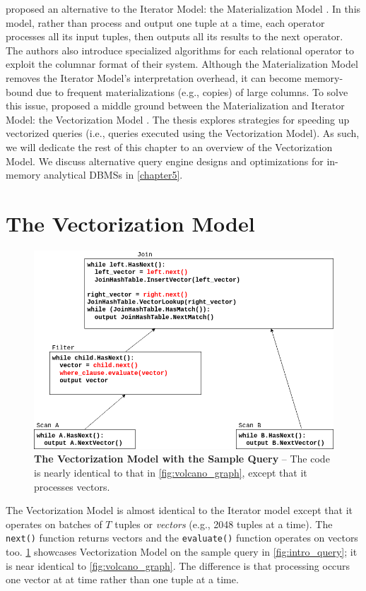 \documentclass[12pt]{cmuthesis}
\begin{document}
\citeauthor{monetdb2} proposed an alternative to the Iterator Model: the Materialization Model \cite{monetdb2}. In this model, rather than process and output one tuple at a time, each operator processes all its input tuples, then outputs all its results to the next operator. The authors also introduce specialized algorithms for each relational operator to exploit the columnar format of their system. Although the Materialization Model removes the Iterator Model's interpretation overhead, it can become memory-bound due to frequent materializations (e.g., copies) of large columns. To solve this issue, \citeauthor{boncz_vector} proposed a middle ground between the Materialization and Iterator Model: the Vectorization Model \cite{boncz_vector}. The thesis explores strategies for speeding up vectorized queries (i.e., queries executed using the Vectorization Model). As such, we will dedicate the rest of this chapter to an overview of the Vectorization Model. We discuss alternative query engine designs and optimizations for in-memory analytical DBMSs in \cref{chapter5}.

\section{The Vectorization Model}
\begin{figure}[t!]
    \centering
    \includegraphics[scale=0.5]{images/Vectorization.png}
    \caption{\textbf{The Vectorization Model with the Sample Query} -- The code is nearly identical to that in \cref{fig:volcano_graph}, except that it processes vectors.}
    \label{fig:vectorization_graph}
\end{figure}

The Vectorization Model is almost identical to the Iterator model except that it operates on batches of $T$ tuples or \textit{vectors} (e.g., 2048 tuples at a time). The \texttt{next()} function returns vectors and the \texttt{evaluate()} function operates on vectors too. \cref{fig:vectorization_graph} showcases Vectorization Model on the sample query in \cref{fig:intro_query}; it is near identical to \cref{fig:volcano_graph}. The difference is that processing occurs one vector at at time rather than one tuple at a time.
\end{document}
